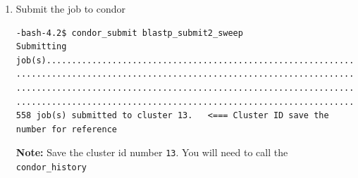 \documentclass{article}
\begin{document}
\begin{enumerate}
\begin{itemize}
\item HTCondor submit sweet: This HTcondor program will submit each of the \verb+txt+ files stored on the folder \verb+OUTPUT+ into BLAST. The result will store on \verb+BLAST_OUTPUT+ 
    \scriptsize
    \begin{verbatim}
-bash-4.2$ vi blastp_submit2_sweep 
    \end{verbatim}
    \normalsize
    \textbf{Note:} Add the number of output files on the \verb+ blastp_submit2_sweep+ last line.
    \scriptsize
    \begin{verbatim}
Universe   = vanilla
Executable = /applications/ncbi-blast-2.2.31+/bin/blastp
Arguments = -db /applications/blastDBs/uniref50 -query /export/home/hrmoncadalopez/Desktop/HTCondor_examples/OUTPUT/output_$(Process).txt
Priority   = high
Should_transfer_files = No
#when_to_tranfer_output = ON_EXIT
ID     = $(Cluster)_$(Process)
FNAME  = blast_output
Output = /export/home/hrmoncadalopez/Desktop/HTCondor_examples/BLAST_OUTPUT/$(FNAME)_$(ID).out
Error  = /export/home/hrmoncadalopez/Desktop/HTCondor_examples/BLAST_OUTPUT/$(FNAME)_$(ID).err
Log    = /export/home/hrmoncadalopez/Desktop/HTCondor_examples/BLAST_OUTPUT/$(FNAME)_$(ID).log
Queue 558                                                                                 <=== Add the number of files here
       \end{verbatim}
       \normalsize
\end{itemize}
\item Submit the job to condor
\tiny
\begin{verbatim}
-bash-4.2$ condor_submit blastp_submit2_sweep 
Submitting job(s).........................................................................................................................
..........................................................................................................................................
..........................................................................................................................................
..................................................................................................
558 job(s) submitted to cluster 13.   <=== Cluster ID save the number for reference
\end{verbatim}
\normalsize
\textbf{Note:} Save the cluster id number \verb+13+. You will need to call the \verb+condor_history+


\end{enumerate}
\end{document}
